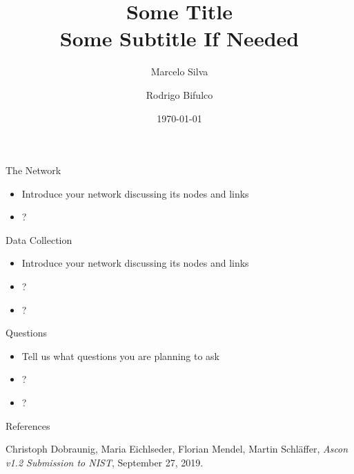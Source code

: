 \documentclass[aspectratio=169]{beamer}
\title{Some Title \\
    Some Subtitle If Needed}
\author{Marcelo Silva \and Rodrigo Bifulco}
\date{\today}
\begin{document}
\begin{frame}
\titlepage
\end{frame}

\begin{frame}{The Network}
\begin{itemize}
    \item Introduce your network discussing its nodes and links
    \item ?
\end{itemize}
\end{frame}

\begin{frame}{Data Collection}
\begin{itemize}
    \item Introduce your network discussing its nodes and links
    \item ?
    \item ?
\end{itemize}
\end{frame}

\begin{frame}{Questions}
\begin{itemize}
    \item Tell us what questions you are planning to ask
    \item ?
    \item ?
\end{itemize}
\end{frame}

\begin{frame}{References}


\begin{thebibliography}{2}

 Christoph Dobraunig, Maria Eichlseder, Florian Mendel,
Martin Schläffer, {\em Ascon v1.2 Submission to NIST}, September 27, 2019.

\end{thebibliography}
\end{frame}
\end{document}
